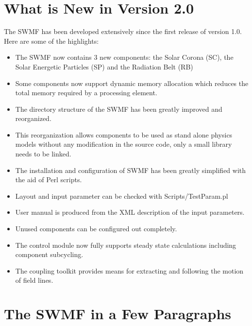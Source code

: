\section{What is New in Version 2.0}

The SWMF has been developed extensively since the first release of
version 1.0. Here are some of the highlights:
\begin{itemize}
\item The SWMF now contains 3 new components:
      the Solar Corona (SC), the Solar Energetic Particles (SP) 
      and the Radiation Belt (RB)
\item Some components now support dynamic memory allocation which 
      reduces the total memory required by a processing element. 
\item The directory structure of the SWMF has been greatly improved and 
      reorganized. 
\item This reorganization allows components to be used as stand alone 
      physics models without any modification in the source code,
      only a small library needs to be linked.
\item The installation and configuration of SWMF has been greatly simplified
      with the aid of Perl scripts. 
\item Layout and input parameter can be checked with Scripts/TestParam.pl
\item User manual is produced from the XML description of the input parameters.
\item Unused components can be configured out completely.
\item The control module now fully supports steady state calculations 
      including component subcycling. 
\item The coupling toolkit provides means for extracting and following 
      the motion of field lines.
\end{itemize}

\section{The SWMF in a Few Paragraphs}

